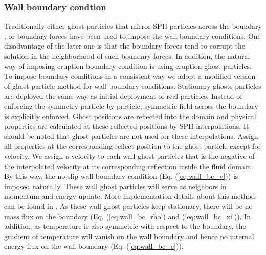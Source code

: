 \documentclass[journal abbreviation, manuscript]{copernicus}
\begin{document}
\subsubsection{Wall boundary condtion}
Traditionally either ghost particles that mirror SPH particles across the boundary \citep {ferrari2009new}, or boundary forces \citep {monaghan2009sph} have been used to impose the wall boundary conditions. One disadvantage of the later one is that the boundary forces tend to corrupt the solution in the neighborhood of such boundary forces. In addition, the natural way of imposing eruption boundary condition is using eruption ghost particles. To impose boundary conditions in a consistent way we adopt a modified version of ghost particle method \citep {kumar2013parallel} for wall boundary conditions. Stationary ghosts particles are deployed the same way as initial deployment of real particles. Instead of enforcing the symmetry particle by particle, symmetric field across the boundary is explicitly enforced. Ghost positions are reflected into the domain and physical properties are calculated at these reflected positions by SPH interpolations. It should be noted that ghost particles are not used for these interpolations. Assign all properties at the corresponding reflect position to the ghost particle except for velocity. We assign a velocity to each wall ghost particles that is the negative of the interpolated velocity at its corresponding reflection inside the fluid domain. By this way, the no-slip wall boundary condition (Eq. (\ref{eq:wall_bc_v})) is imposed naturally. These wall ghost particles will serve as neighbors in momentum and energy update. More implementation details about this method can be found in \citep {kumar2013parallel}. As these wall ghost particles keep stationary, there will be no mass flux on the boundary (Eq. (\ref{eq:wall_bc_rho}) and (\ref{eq:wall_bc_xi})). In addition, as temperature is also symmetric with respect to the boundary, the gradient of temperature will vanish on the wall boundary and hence no internal energy flux on the wall boundary (Eq. (\ref{eq:wall_bc_e})). 
\end{document}
